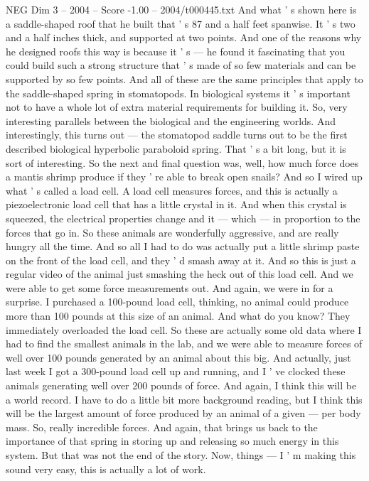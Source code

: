 \begin{textsample}{NEG Dim 3 – 2004 – Score -1.00 – 2004/t000445.txt}
And what ' s shown here is a saddle-shaped roof that he built that ' s 87 and a half feet spanwise.
It ' s two and a half inches thick, and supported at two points.
And one of the reasons why he designed roofs this way is because it ' s — he found it fascinating that you could build such a strong structure that ' s made of so few materials and can be supported by so few points.
And all of these are the same principles that apply to the saddle-shaped spring in stomatopods.
In biological systems it ' s important not to have a whole lot of extra material requirements for building it.
So, very interesting parallels between the biological and the engineering worlds.
And interestingly, this turns out — the stomatopod saddle turns out to be the first described biological hyperbolic paraboloid spring.
That ' s a bit long, but it is sort of interesting.
So the next and final question was, well, how much force does a mantis shrimp produce if they ' re able to break open snails?
And so I wired up what ' s called a load cell.
A load cell measures forces, and this is actually a piezoelectronic load cell that has a little crystal in it.
And when this crystal is squeezed, the electrical properties change and it — which — in proportion to the forces that go in.
So these animals are wonderfully aggressive, and are really hungry all the time.
And so all I had to do was actually put a little shrimp paste on the front of the load cell, and they ' d smash away at it.
And so this is just a regular video of the animal just smashing the heck out of this load cell.
And we were able to get some force measurements out.
And again, we were in for a surprise.
I purchased a 100-pound load cell, thinking, no animal could produce more than 100 pounds at this size of an animal.
And what do you know?
They immediately overloaded the load cell.
So these are actually some old data where I had to find the smallest animals in the lab, and we were able to measure forces of well over 100 pounds generated by an animal about this big.
And actually, just last week I got a 300-pound load cell up and running, and I ' ve clocked these animals generating well over 200 pounds of force.
And again, I think this will be a world record.
I have to do a little bit more background reading, but I think this will be the largest amount of force produced by an animal of a given — per body mass.
So, really incredible forces.
And again, that brings us back to the importance of that spring in storing up and releasing so much energy in this system.
But that was not the end of the story.
Now, things — I ' m making this sound very easy, this is actually a lot of work.

\end{textsample}

